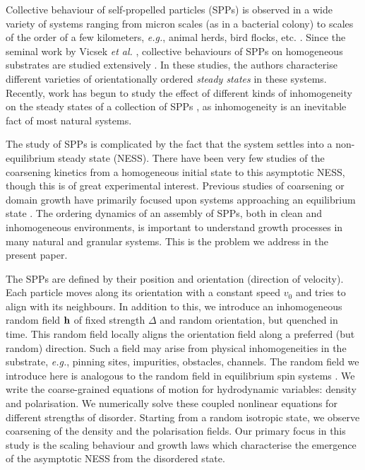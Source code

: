 \documentclass[pre,twocolumn,amssymb,showpacs,superscriptaddress,notitlepage]{revtex4-1}
\begin{document}
\maketitle


Collective behaviour of self-propelled particles (SPPs) is observed in a wide variety of systems ranging from micron scales (as in a bacterial colony) to scales of the order of a few kilometers, {\it e.g.}, animal herds, bird flocks, etc.
\cite{animalgroup, helbing, feder, kuusela31, hubbard, rauch, benjacob,  harada, nedelec, schaller}.
Since the seminal work by Vicsek {\it et al.} \cite{vicsek}, collective behaviours of SPPs on homogeneous substrates are studied
extensively \cite{tonertu, tonertusr, srrmp, vicsekrev, chatepre, sppexp}. In these studies, the authors characterise different
varieties of orientationally ordered {\it steady states} in these systems. Recently, work has begun to study the effect of different kinds of inhomogeneity on the steady states of a collection of SPPs \cite{disorderst, bechinger}, as inhomogeneity is an inevitable fact of most natural systems.

The study of SPPs is complicated by the fact that the system settles into a non-equilibrium steady state (NESS). There have been very few studies \cite{chatepre} of the coarsening kinetics from a homogeneous initial state to this asymptotic NESS, though this is of great experimental interest. Previous studies of coarsening or domain growth have primarily focused upon systems approaching an equilibrium state \cite{ajbray1994,puribook}. The ordering dynamics of an assembly of SPPs, both in clean and inhomogeneous environments, is important to understand growth processes in many natural and granular systems. This is the problem we address in the present paper.
 
The SPPs are defined by their position and orientation (direction of velocity). Each particle moves along its orientation with a constant speed $v_0$ and tries to align with its neighbours. In addition to this, we introduce an inhomogeneous random field  
${\bf h}$ of fixed strength $\Delta$ and random orientation, but quenched in time. This random field locally aligns the orientation field along a preferred (but random) direction. Such a field may arise from physical inhomogeneities in the substrate, {\it e.g.}, pinning sites, impurities, obstacles, channels. The random field we introduce here is analogous to the random field in equilibrium spin systems \cite{im75,tn98}. We write the coarse-grained equations of motion for hydrodynamic variables: density and polarisation. We numerically solve these coupled nonlinear equations for different strengths of disorder. Starting from a random isotropic state, we observe coarsening of the density and the polarisation fields. Our primary focus in this study is the scaling behaviour and growth laws \cite{puribook} which characterise the emergence of the asymptotic NESS from the disordered state.
\end{document}
